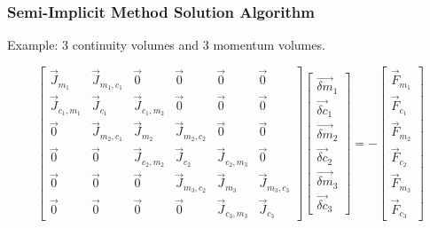 \documentclass[compress,xcolor=table]{beamer}
\begin{document}
\begin{frame}
\frametitle{Semi-Implicit Method Solution Algorithm}

Example: 3 continuity volumes and 3 momentum volumes.

\begin{equation*}
\begin{bmatrix} 
\vec{J}_{m_1} & \vec{J}_{m_1,c_1} & \vec{0} & \vec{0} & \vec{0} & \vec{0}\\
\vec{J}_{c_1,m_1} & \vec{J}_{c_1} & \vec{J}_{c_1,m_2} & \vec{0} & \vec{0} & \vec{0} \\
\vec{0} & \vec{J}_{m_2,c_1} & \vec{J}_{m_2} & \vec{J}_{m_2,c_2} & \vec{0} & \vec{0} \\
\vec{0} & \vec{0} & \vec{J}_{c_2,m_2} & \vec{J}_{c_2} & \vec{J}_{c_2,m_3} & \vec{0} \\
\vec{0} & \vec{0} & \vec{0} & \vec{J}_{m_3,c_2} & \vec{J}_{m_3} & \vec{J}_{m_3,c_3} \\ 
\vec{0} & \vec{0} & \vec{0} & \vec{0} & \vec{J}_{c_3,m_3} & \vec{J}_{c_3}  
\end{bmatrix} \begin{bmatrix}
\vec{\delta m}_{1} \\ \vec{\delta c}_{1} \\
\vec{\delta m}_{2} \\ \vec{\delta c}_{2} \\
\vec{\delta m}_{3} \\ \vec{\delta c}_{3}
\end{bmatrix}  = -\begin{bmatrix}
\vec{F}_{m_1} \\ \vec{F}_{c_1} \\
\vec{F}_{m_2} \\ \vec{F}_{c_2} \\
\vec{F}_{m_3} \\ \vec{F}_{c_3} \end{bmatrix}
\end{equation*}

\end{frame}
\end{document}
